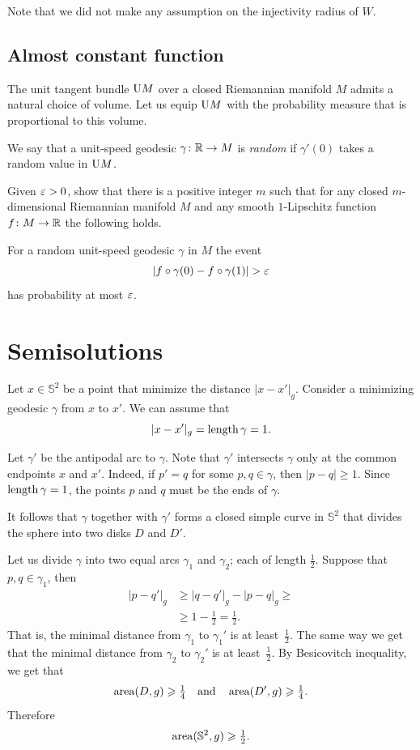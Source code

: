 Note that we did not make any assumption on the injectivity radius of $W$.

\subsection*{Almost constant function}
\label{Almost constant function}

The unit tangent bundle $\mathrm{U} M$ over a closed Riemannian manifold $M$
admits a natural choice of volume.
Let us equip $\mathrm{U} M$ with the probability measure that is proportional to this volume.

We say that a unit-speed geodesic $\gamma\colon\mathbb{R}\to M$ is \emph{random}
if $\gamma'(0)$ takes a random value in $\mathrm{U} M$.

\begin{pr}
Given $\varepsilon>0$,
show that there is a positive integer $m$ such that
for any closed $m$-dimensional Riemannian manifold $M$
and any smooth $1$-Lipschitz function $f\colon M\to\mathbb{R}$ the following holds.

For a random unit-speed geodesic $\gamma$ in $M$ 
the event 
\[|f\circ\gamma(0)-f\circ\gamma(1)|>\eps\]
has probability at most $\varepsilon$.
\end{pr}


\section*{Semisolutions}

Let $x\in \mathbb{S}^2$ be a point that minimize the distance $|x-x'|_g$.
Consider a minimizing geodesic $\gamma$ from $x$ to $x'$.
We can assume that 
\[|x-x'|_g=\operatorname{\rm length} \gamma=1.\]

Let $\gamma'$ be the antipodal arc to $\gamma$.
Note that $\gamma'$ intersects $\gamma$ only at the common endpoints $x$ and $x'$.
Indeed, if $p'=q$ for some $p,q\in\gamma$, then $|p-q|\ge 1$.
Since $\operatorname{\rm length} \gamma=1$, the points $p$ and $q$ must be the ends of $\gamma$.

It follows that $\gamma$ together with $\gamma'$ forms a closed simple curve in $\mathbb{S}^2$
that divides the sphere into two disks $D$ and $D'$.

Let us divide $\gamma$ into two equal arcs $\gamma_1$ and $\gamma_2$; each of length $\tfrac12$.
Suppose that $p,q\in\gamma_1$, then 
\begin{align*}
|p-q'|_g&\ge |q-q'|_g-|p-q|_g\ge
\\
&\ge 1-\tfrac12=\tfrac12.
\end{align*}
That is, the minimal distance from $\gamma_1$ to $\gamma_1'$ is at least~$\tfrac12$.
The same way we get that the minimal distance from $\gamma_2$ to $\gamma_2'$ is at least~$\tfrac12$.
By Besicovitch inequality, we get that 
\[\operatorname{\rm area}\nolimits(D,g)\geqslant \tfrac14\quad\text{and}\quad \operatorname{\rm area}\nolimits(D',g)\geqslant \tfrac14.\]
Therefore 
\[\operatorname{\rm area}\nolimits(\mathbb{S}^2,g)\geqslant\tfrac12.\]
\qedsf

